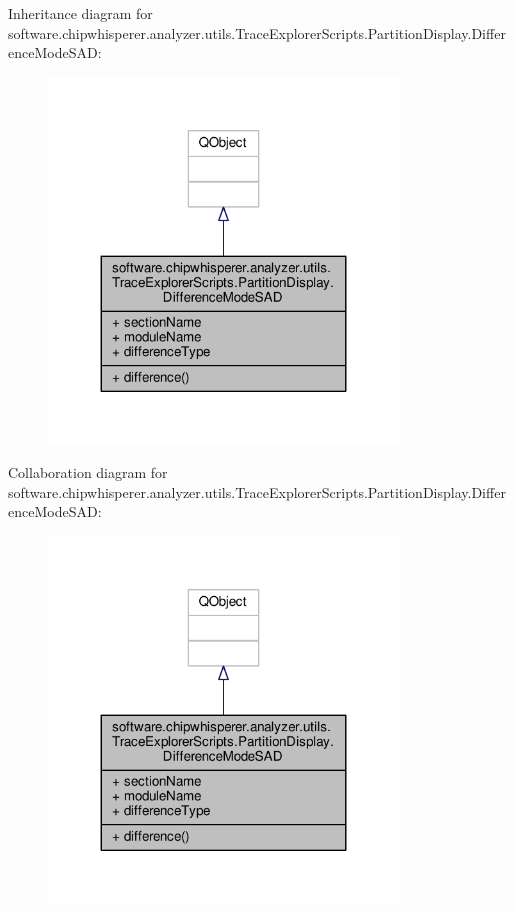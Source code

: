Inheritance diagram for software.\+chipwhisperer.\+analyzer.\+utils.\+Trace\+Explorer\+Scripts.\+Partition\+Display.\+Difference\+Mode\+S\+A\+D\+:\nopagebreak
\begin{figure}[H]
\begin{center}
\leavevmode
\includegraphics[width=263pt]{d9/dcc/classsoftware_1_1chipwhisperer_1_1analyzer_1_1utils_1_1TraceExplorerScripts_1_1PartitionDisplay_74a6773223a6b997ee3b33992ac635e6}
\end{center}
\end{figure}


Collaboration diagram for software.\+chipwhisperer.\+analyzer.\+utils.\+Trace\+Explorer\+Scripts.\+Partition\+Display.\+Difference\+Mode\+S\+A\+D\+:\nopagebreak
\begin{figure}[H]
\begin{center}
\leavevmode
\includegraphics[width=263pt]{dc/db4/classsoftware_1_1chipwhisperer_1_1analyzer_1_1utils_1_1TraceExplorerScripts_1_1PartitionDisplay_c5e9a00198b3d0005f883c1d56a125cf}
\end{center}
\end{figure}


